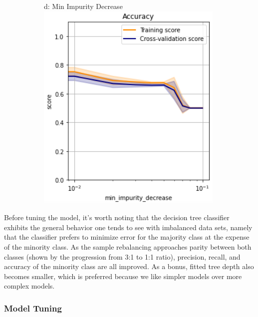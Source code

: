 \documentclass{article}
\begin{document}
\begin{figure}
\begin{subfigure}{.24\textwidth}
	\end{subfigure}
	\begin{subfigure}{.24\textwidth}
		d: Min Impurity Decrease
	\centering
	\includegraphics[width=\linewidth]{poland_decision_min_impurity_decrease_accuracy.png}
	
	\end{subfigure}

	\label{fig:test}
\end{figure}


Before tuning the model, it's worth noting that the decision tree classifier exhibits the general behavior one tends to see with imbalanced data sets, namely that the classifier prefers to minimize error for the majority class at the expense of the minority class. As the sample rebalancing approaches parity between both classes (shown by the progression from 3:1 to 1:1 ratio), precision, recall, and accuracy of the minority class are all improved. As a bonus, fitted tree depth also becomes smaller, which is preferred because we like simpler models over more complex models. \newline

\subsubsection*{Model Tuning}
\end{document}
